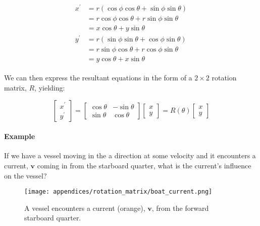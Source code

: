 \begin{align}
    \begin{split}
    x^{\prime} &= r(\cos\phi\cos\theta + \sin\phi\sin\theta) \\
               &= r\cos\phi\cos\theta + r\sin\phi\sin\theta \\
               &= x\cos\theta + y\sin\theta \\
    y^{\prime} &= r(\sin\phi\sin\theta + \cos\phi\sin\theta) \\
               &= r\sin\phi\cos\theta + r\cos\phi\sin\theta \\
               &= y\cos\theta + x\sin\theta
    \end{split}
\end{align}

We can then express the resultant equations in the form of a $2 \times 2$ rotation matrix, $R$, yielding:

\begin{equation}
    \left[
        \begin{matrix}
            x^{\prime} \\ 
            y^{\prime}
        \end{matrix}
    \right]
    =
    \left[
        \begin{matrix}
            \cos\theta & -\sin\theta \\
            \sin\theta & \cos\theta
        \end{matrix}
    \right]
    \left[
        \begin{matrix}
            x \\
            y
        \end{matrix}
    \right]
    = R(\theta)
    \left[
        \begin{matrix}
            x \\
            y
        \end{matrix}
    \right]
\end{equation}

\paragraph*{Example} If we have a vessel moving in the a direction at some velocity and it encounters a current, $\pmb{v}$ coming in from the starboard quarter, what is the current's influence on the vessel?

\begin{figure}[h!]
    \caption[A vessel encounters a current]{A vessel encounters a current (orange), $\pmb{v}$, from the forward starboard quarter.}
    \centering
    \texttt{[image: appendices/rotation\_matrix/boat\_current.png]}
\end{figure}

